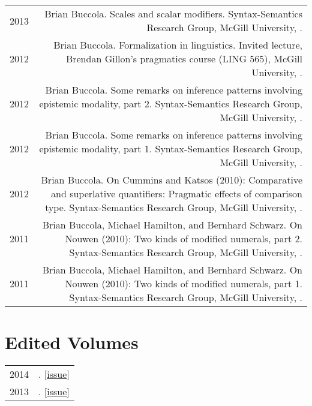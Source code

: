 \documentclass[letterpaper]{article}
\makeatletter
\newcommand{\name}{Brian Buccola}
\newcommand{\myvrule}{\color{lightgray}\vrule width 1.0pt}
\newenvironment{cvsection}{%
  \renewcommand{\arraystretch}{1.75}
  \begin{longtable}[l]{@{} L R @{}}
}{%
  \end{longtable}
}
\makeatother
\begin{document}
\begin{cvsection}
  2013 & \name. Scales and scalar modifiers. Syntax-Semantics Research Group,
  McGill University, . \\

  2012 & \name. Formalization in linguistics.  Invited lecture, Brendan
  Gillon's pragmatics course (LING 565), McGill University,
  . \\

  2012 & \name. Some remarks on inference patterns involving epistemic
  modality, part 2. Syntax-Semantics Research Group, McGill University,
  . \\

  2012 & \name. Some remarks on inference patterns involving epistemic
  modality, part 1. Syntax-Semantics Research Group, McGill University,
  . \\

  2012 & \name. On Cummins and Katsos (2010): Comparative and superlative
  quantifiers: Pragmatic effects of comparison type. Syntax-Semantics Research
  Group, McGill University, . \\

  2011 & \name, Michael Hamilton, and Bernhard Schwarz. On Nouwen (2010): Two
  kinds of modified numerals, part 2. Syntax-Semantics Research Group, McGill
  University, . \\

  2011 & \name, Michael Hamilton, and Bernhard Schwarz. On Nouwen (2010): Two
  kinds of modified numerals, part 1. Syntax-Semantics Research Group, McGill
  University, . \\
\end{cvsection}



\section*{Edited Volumes}

\begin{cvsection}
  2014 & \null{}.
  [\href{https://www.mcgill.ca/mcgwpl/archives/volume-241-2014}{issue}] \\
  2013 & \null{}.
  [\href{https://www.mcgill.ca/mcgwpl/archives/volume-231-2013}{issue}]
\end{cvsection}
\end{document}
